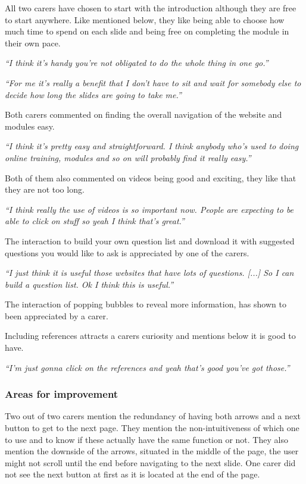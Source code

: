 \documentclass{sigchi}
\begin{document}
All two carers have chosen to start with the introduction although they are free to start anywhere. Like mentioned below, they like being able to choose how much time to spend on each slide and being free on completing the module in their own pace. 

\textit{“I think it’s handy you’re not obligated to do the whole thing in one go.”} 

\textit{“For me it’s really a benefit that I don't have to sit and wait for somebody else to decide how long the slides are going to take me.”}

Both carers commented on finding the overall navigation of the website and modules easy.

\textit{“I think it’s pretty easy and straightforward. I think anybody who’s used to doing online training, modules and so on will probably find it really easy.”}

Both of them also commented on videos being good and exciting, they like that they are not too long. 

\textit{“I think really the use of videos is so important now. People are expecting to be able to click on stuff so yeah I think that’s great.”}

The interaction to build your own question list and download it with suggested questions you would like to ask is appreciated by one of the carers. 

\textit{“I just think it is useful those websites that have lots of questions. [...] So I can build a question list. Ok I think this is useful.”} 

The interaction of popping bubbles to reveal more information, has shown to been appreciated by a carer.

Including references attracts a carers curiosity and mentions below it is good to have.

\textit{“I’m just gonna click on the references and yeah that’s good you’ve got those.”}

\subsubsection{Areas for improvement}
Two out of two carers mention the redundancy of having both arrows and a next button to get to the next page. They mention the non-intuitiveness of which one to use and to know if these actually have the same function or not. They also mention the downside of the arrows, situated in the middle of the page, the user might not scroll until the end before navigating to the next slide. One carer did not see the next button at first as it is located at the end of the page.
\end{document}
